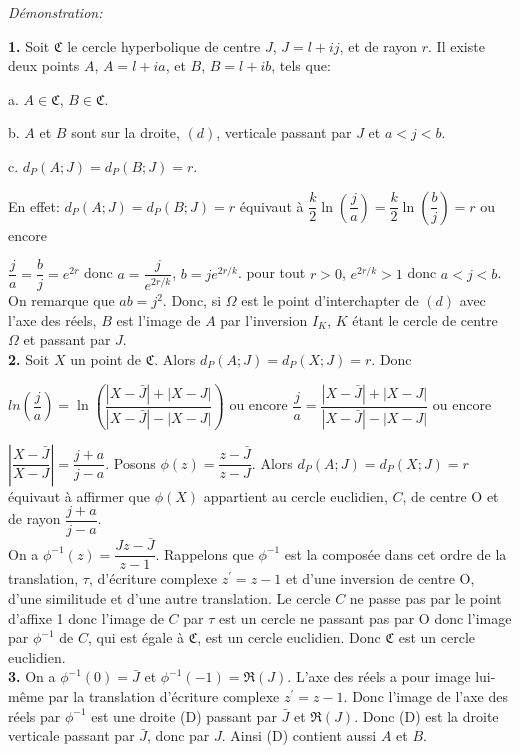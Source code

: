 \documentclass[a4paper, 12pt, twoside]{book}
\begin{document}
 
 \textit{Démonstration:}\
 
 \textbf{1.} Soit $\mathfrak{C}$ le cercle hyperbolique de centre $J$, $J=l+ij$, et de rayon $r$. Il existe deux points $A$, $A=l+ia$,  et $B$, $B=l+ib$, tels que:\
 
 a. $A\in \mathfrak{C}$, $B\in \mathfrak{C}$.\
 
 b. $A$ et $B$ sont sur la droite, $(d)$, verticale passant par $J$ et $a<j<b$.\
 
 c. $d_{P}(A;J)=d_{P}(B;J)=r$.\
 
 En effet: $d_{P}(A;J)=d_{P}(B;J)=r$ équivaut à  $\dfrac{k}{2}\ln(\dfrac{j}{a})=\dfrac{k}{2}\ln(\dfrac{b}{j})=r$ ou encore\
 
 $\dfrac{j}{a}=\dfrac{b}{j}=e^{2r}$ donc $a=\dfrac{j}{e^{2r/k}}$, $b=je^{2r/k}$. pour tout $r>0$, $e^{2r/k}>1$ donc $a<j<b$.\\
 
  On remarque que $ab=j^{2}$. Donc, si $\Omega$ est le point d'interchapter de $(d)$ avec l'axe des réels, $B$ est l'image de $A$ par l'inversion $I_{K}$, $K$ étant le cercle de centre $\Omega$ et passant par $J$.\\
  
 
 \textbf{2.} Soit $X$ un point de $\mathfrak{C}$. Alors  $d_{P}(A;J)=d_{P}(X;J)=r$. Donc\
 
  $ln(\dfrac{j}{a})=\ln(\dfrac{|X-\bar{J}|+|X-J|}{|X-\bar{J}|-|X-J|})$ ou encore $\dfrac{j}{a}=\dfrac{|X-\bar{J}|+|X-J|}{|X-\bar{J}|-|X-J|}$ ou encore\
  
   $|\dfrac{X-\bar{J}}{X-J}|=\dfrac{j+a}{j-a}$. Posons $\phi(z)=\dfrac{z-\bar{J}}{z-J}$. Alors   $d_{P}(A;J)=d_{P}(X;J)=r$ équivaut à affirmer que $\phi(X)$ appartient au cercle euclidien, $C$, de centre O et de rayon $\dfrac{j+a}{j-a}$.\\
   
   On a $\phi^{-1}(z)=\dfrac{Jz-\bar{J}}{z-1}$.  Rappelons que $\phi^{-1}$ est la composée dans cet ordre de la translation, $\tau$, d'écriture complexe $z^{'}=z-1$ et d'une inversion de centre O, d'une similitude et d'une autre translation.  Le cercle $C$ ne passe pas par le point d'affixe 1 donc l'image de $C$ par $\tau$ est un cercle ne passant pas par O donc l'image par $\phi^{-1}$ de $C$, qui est égale à $\mathfrak{C}$,  est un cercle euclidien. Donc $\mathfrak{C}$ est un cercle euclidien.\\
   
   
   \textbf{3.} On a $\phi^{-1}(0)=\bar{J}$ et $\phi^{-1}(-1)=\Re{(J)}$. L'axe des réels a pour image lui-même par la translation d'écriture complexe $z^{'}=z-1$. Donc l'image de l'axe des réels par $\phi^{-1}$ est une droite (D) passant par $\bar{J}$ et $\Re{(J)}$. Donc (D) est la droite verticale passant par $\bar{J}$, donc par $J$. Ainsi (D) contient aussi $A$ et $B$.\
   
\end{document}
